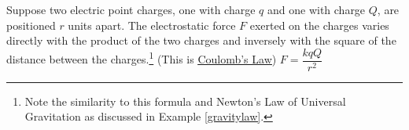 {Suppose two electric point charges, one with charge $q$ and one with charge $Q$, are positioned $r$ units apart. The electrostatic force $F$ exerted on the charges varies directly with the product of the two charges and inversely with the square of the distance between the charges.\footnote{Note the similarity to this formula and Newton's Law of Universal Gravitation as discussed in Example \ref{gravitylaw}.}  (This is \href{http://en.wikipedia.org/wiki/Electrostatic\#Coulomb.27s_law}{\underline{Coulomb's Law}})  }
{$F = \dfrac{kqQ}{r^2}$   }